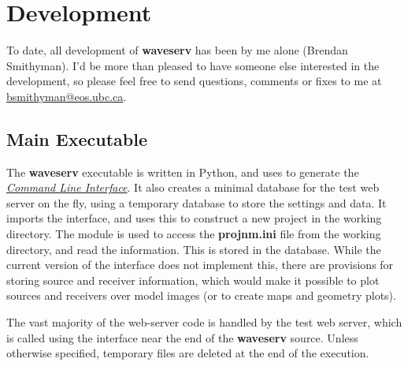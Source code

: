 \documentclass[letterpaper,10pt,english]{sphinxmanual}
\begin{document}
\chapter{Development}
\label{development:development}\label{development::doc}\label{development:devel}
To date, all development of \textbf{waveserv} has been by me alone (Brendan Smithyman).  I'd be more than pleased to have someone else interested in the development, so please feel free to send questions, comments or fixes to me at \href{mailto:bsmithyman@eos.ubc.ca}{bsmithyman@eos.ubc.ca}.


\section{Main Executable}
\label{development:main-executable}
The \textbf{waveserv} executable is written in Python, and uses \href{http://docs.python.org/library/optparse.html\#optparse}{} to generate the {\hyperref[cli:cli]{\emph{Command Line Interface}}}.  It also creates a minimal database for the  test web server on the fly, using a temporary \href{http://docs.python.org/library/sqlite3.html\#sqlite3}{} database to store the settings and data.  It imports the  interface, and uses this to construct a new  project in the working directory.  The  module is used to access the \textbf{projnm.ini} file from the working directory, and read the information.  This is stored in the  database.  While the current version of the interface does not implement this, there are provisions for storing source and receiver information, which would make it possible to plot sources and receivers over model images (or to create maps and geometry plots).

The vast majority of the web-server code is handled by the  test web server, which is called using the  interface near the end of the \textbf{waveserv} source.  Unless otherwise specified, temporary files are deleted at the end of the execution.
\end{document}

